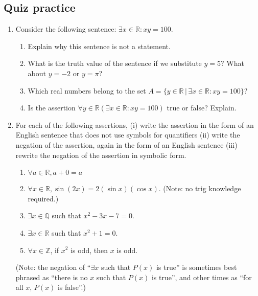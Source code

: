 \documentclass[letterpaper,12pt]{article}
\newcommand{\Z}{\mathbb{Z}}
\newcommand{\R}{\mathbb{R}}
\begin{document}
\subsection*{Quiz practice}
\begin{enumerate}
 \item Consider the following sentence: $\exists x\in\R : xy=100$.
\begin{enumerate}
 \item Explain why this sentence is not a statement.
 \item What is the truth value of the sentence if we substitute $y=5$? What about $y=-2$ or $y=\pi$?
 \item Which real numbers belong to the set $A=\{y\in \R\,|\, \exists x\in \R: xy=100\}$?
 \item Is the assertion $\forall y\in\R (\exists x\in\R : xy=100)$ true or false? Explain.
 \end{enumerate}
 \item For each of the following assertions, (i) write the assertion in the form of an English sentence that does not use symbols for quantifiers (ii) write the negation of the assertion, again in the form of an English sentence (iii) rewrite the negation of the assertion in symbolic form.
\begin{enumerate}
 \item $\forall a\in\R, a+0=a$
 \item $\forall x\in\R, \sin(2x) = 2(\sin x)(\cos x)$. (Note: no trig knowledge required.)
 \item $\exists x\in\mathbb{Q}$ such that $x^2-3x-7=0$.
 \item $\exists x\in\R$ such that $x^2+1=0$.
 \item $\forall x\in \Z$, if $x^2$ is odd, then $x$ is odd.
\end{enumerate}
(Note: the negation of ``$\exists x$ such that $P(x)$ is true'' is sometimes best phrased as ``there is no $x$ such that $P(x)$ is true'', and other times as ``for all $x$, $P(x)$ is false''.)


\end{enumerate}
\end{document}
